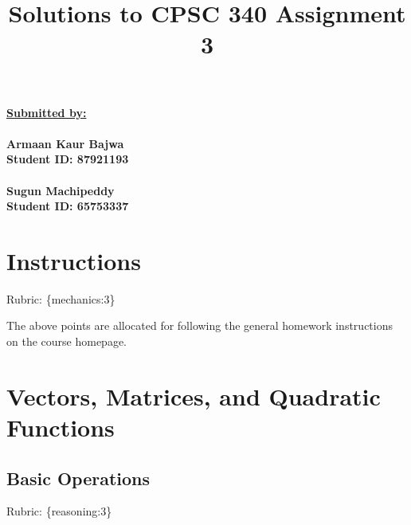 \documentclass{article}
\def\rubric#1{\gre{Rubric: \{#1\}}}{}
\def\gre#1{{\color{gre}#1}}
\begin{document}
\title{Solutions to CPSC 340 Assignment 3}
\date{}
\maketitle

\vspace{-2em}

\underline{\textbf{Submitted by:}}\\ \\
 \textbf{Armaan Kaur Bajwa\\
 Student ID: 87921193\\ \\
 Sugun Machipeddy\\
 Student ID: 65753337} 

\section*{Instructions}
\rubric{mechanics:3}

The above points are allocated for following the general homework instructions on the course homepage.

\section{Vectors, Matrices, and Quadratic Functions}

\subsection{Basic Operations}
\rubric{reasoning:3}
\end{document}

